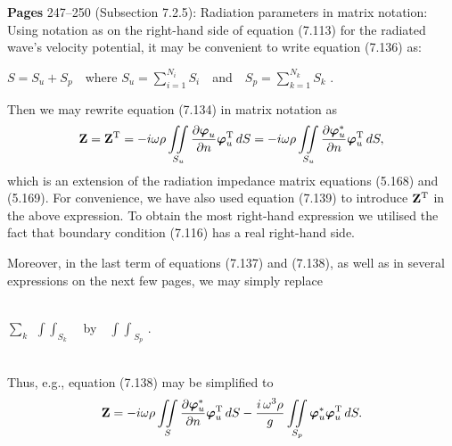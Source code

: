 \documentclass[a4paper,12pt]{article}
\newcommand{\bvf}{\mbox{\boldmath $\varphi$}} %
\newcommand{\tr}{^{\rm T}} %
\begin{document}
\noindent %
\vspace{0.2cm}
{\bf Pages} 247--250 (Subsection 7.2.5): Radiation parameters in matrix notation: \\
Using notation as on the right-hand side of equation (7.113) for the radiated wave's velocity potential, it may be convenient to write equation (7.136) as: \\
\vspace{-0.1cm}

$S=S_u + S_p$  \,\, where $S_u=\sum_{i=1}^{N_i}S_i$  \,\, and  \,\, $S_p=\sum_{k=1}^{N_k}S_k$ .
\vspace{0.3cm}

Then we may rewrite equation (7.134) in matrix notation as \\
\begin{equation}
{\bf Z}= {\bf Z}{\tr} = -i\omega\rho \mathop{\int\!\!\!\int}_{S_u}
	\frac{\partial \bvf_{u}}{\partial n}\bvf_{u}\tr\, dS
       = -i\omega\rho \mathop{\int\!\!\!\int}_{S_u}
	\frac{\partial \bvf_{u}^*}{\partial n}\bvf_{u}\tr\, dS
\nonumber ,
\end{equation}
which is an extension of the radiation impedance matrix equations (5.168) and (5.169). For convenience, we have also used equation (7.139) to introduce ${\bf Z}{\tr}$ in the above expression. To obtain the most right-hand expression we utilised the fact that boundary condition (7.116) has a real right-hand side. 

Moreover, in the last term of equations (7.137) and (7.138), as well as in several expressions on the next few pages, we may simply replace \\
\\ %
\centerline{ $\sum_k  \,\, \mathop{\int\!\!\!\int}_{S_k}$  \,\, by  \,\, ${\int\!\!\!\int}_{S_p}$ .} \\ 

\noindent
Thus, e.g., equation (7.138) may be simplified to \\
\begin{equation}
{\bf Z} = -i\omega\rho \mathop{\int\!\!\!\int}_{S}
	\frac{\partial \bvf_{u}^*}{\partial n}\bvf_{u}\tr\, dS - 
	\frac{i \, \omega^3 \rho}{g} \mathop{\int\!\!\!\int}_{S_p}
	\bvf_{u}^*\bvf_{u}\tr\, dS .
\nonumber 
\end{equation}
\end{document}

